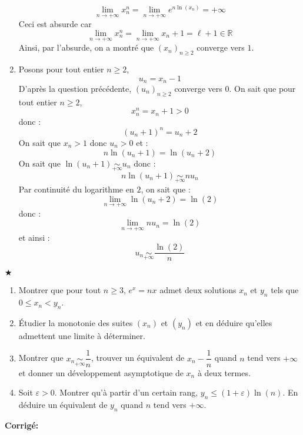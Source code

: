 \documentclass[a4paper,twoside,french,10pt]{VcCours}
\newcommand{\corr}{\textbf{Corrigé:}}
\begin{document}
\begin{enumerate}
\[ \lim_{n \rightarrow + \infty} x_n^n = \lim_{n \rightarrow + \infty} e^{n \ln(x_n)} = + \infty \]
Ceci est absurde car 
$$\lim_{n \rightarrow + \infty} x_n^n = \lim_{n \rightarrow + \infty} x_n + 1 = \ell + 1 \in \mathbb{R}$$
Ainsi, par l'absurde, on a montré que $(x_n)_{n \geq 2}$ converge vers $1$.
\item Posons pour tout entier $n \geq 2$, 
$$ u_n = x_n -1$$
D'après la question précédente, $(u_n)_{n \geq 2}$ converge vers $0$.  On sait que pour tout entier $n \geq 2$,
$$ x_n^n = x_n + 1 >0$$
donc :
$$ (u_n+1)^n = u_n +2 $$
On sait que $x_n>1$ donc $u_n>0$ et :
$$ n \ln(u_n + 1) = \ln(u_n+2)$$
On sait que $\ln(u_n+1) \underset{+ \infty}{\sim} u_n$ donc :
$$ n \ln(u_n + 1) \underset{+ \infty}{\sim} nu_n$$
Par continuité du logarithme en $2$, on sait que :
$$ \lim_{n \rightarrow + \infty} \ln(u_n+2) = \ln(2)$$
donc :
$$ \lim_{n \rightarrow + \infty} n u_n = \ln(2)$$
et ainsi :
$$ u_n \underset{+ \infty}{\sim} \dfrac{\ln(2)}{n}$$
\end{enumerate}


\medskip


\begin{Exercice}{$\bigstar$} \begin{enumerate}
\item Montrer que pour tout $n \geq 3$, $e^x=nx$ admet deux solutions $x_n$ et $y_n$ tels que $0 \leq x_n <y_n$.
\item Étudier la monotonie des suites $(x_n)$ et $(y_n)$ et en déduire qu'elles admettent une limite à déterminer.
\item Montrer que $x_n \underset{+ \infty}{\sim} \dfrac{1}{n}$, trouver un équivalent de $x_n - \dfrac{1}{n}$ quand $n$ tend vers $+ \infty$ et donner un développement asymptotique de $x_n$ à deux termes.
\item Soit $\varepsilon >0$. Montrer qu'à partir d'un certain rang, $y_n \leq (1+ \varepsilon) \ln(n)$. En déduire un équivalent de $y_n$ quand $n$ tend vers $+ \infty$.
\end{enumerate}
\end{Exercice}

\corr
\end{document}
